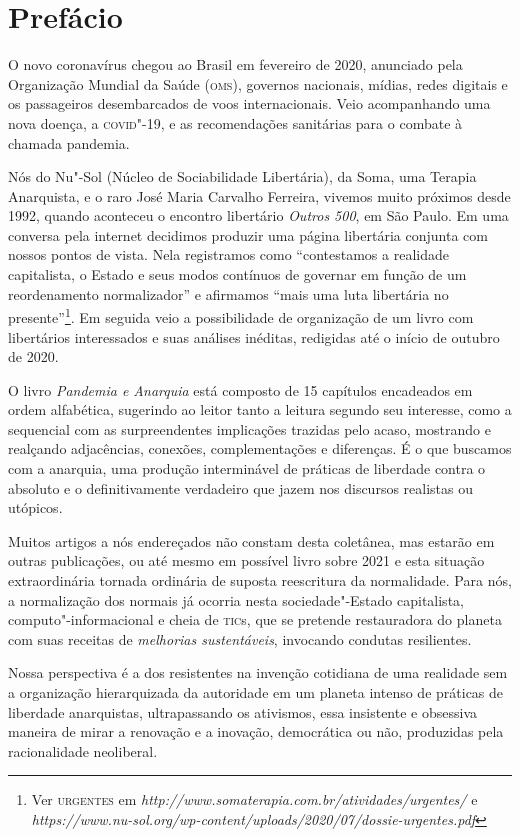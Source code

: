 
\chapter{Prefácio}

O novo coronavírus chegou ao Brasil em fevereiro de 2020, anunciado pela
Organização Mundial da Saúde (\textsc{oms}), governos nacionais, mídias, redes
digitais e os passageiros desembarcados de voos internacionais. Veio
acompanhando uma nova doença, a \textsc{covid}"-19, e as recomendações sanitárias
para o combate à chamada pandemia.

Nós do Nu"-Sol (Núcleo de Sociabilidade Libertária), da Soma, uma Terapia
Anarquista, e o raro José Maria Carvalho Ferreira, vivemos muito
próximos desde 1992, quando aconteceu o encontro libertário \emph{Outros
500}, em São Paulo. Em uma conversa pela internet decidimos produzir uma
página libertária conjunta com nossos pontos de vista. Nela registramos
como ``contestamos a realidade capitalista, o Estado e seus modos
contínuos de governar em função de um reordenamento normalizador'' e
afirmamos ``mais uma luta libertária no presente''\footnote{Ver \textsc{urgentes}
  em \emph{http://www.somaterapia.com.br/atividades/urgentes/} e
  \emph{https://www.nu-sol.org/wp-content/uploads/2020/07/dossie-urgentes.pdf}}.
Em seguida veio a possibilidade de organização de um livro com
libertários interessados e suas análises inéditas, redigidas até o
início de outubro de 2020.

O livro \emph{Pandemia e Anarquia} está composto de 15 capítulos
encadeados em ordem alfabética, sugerindo ao leitor tanto a leitura
segundo seu interesse, como a sequencial com as surpreendentes
implicações trazidas pelo acaso, mostrando e realçando adjacências,
conexões, complementações e diferenças. É o que buscamos com a anarquia,
uma produção interminável de práticas de liberdade contra o absoluto e o
definitivamente verdadeiro que jazem nos discursos realistas ou
utópicos.

Muitos artigos a nós endereçados não constam desta coletânea, mas
estarão em outras publicações, ou até mesmo em possível livro sobre 2021
e esta situação extraordinária tornada ordinária de suposta reescritura
da normalidade. Para nós, a normalização dos normais já ocorria nesta
sociedade"-Estado capitalista, computo"-informacional e cheia de \textsc{tic}s, que
se pretende restauradora do planeta com suas receitas de \emph{melhorias
sustentáveis}, invocando condutas resilientes.

Nossa perspectiva é a dos resistentes na invenção cotidiana de uma
realidade sem a organização hierarquizada da autoridade em um planeta
intenso de práticas de liberdade anarquistas, ultrapassando os
ativismos, essa insistente e obsessiva maneira de mirar a renovação e a
inovação, democrática ou não, produzidas pela racionalidade neoliberal.

